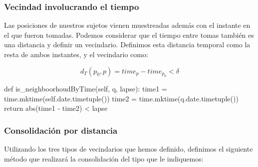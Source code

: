 \documentclass[10pt, spanish]{beamer}
\begin{document}
\begin{frame}[fragile]
\frametitle{Vecindad involucrando el tiempo}
Las posiciones de nuestros sujetos vienen muestreadas adem\'as con el instante en el que fueron tomadas. Podemos considerar que el tiempo entre tomas tambi\'en es una distancia y definir un vecindario. Definimos esta distancia temporal como la resta de ambos instantes, y el vecindario como: 

$$ d_T(p_0, p) = time_p - time_{p_0} < \delta $$

\bigskip

\begin{python}
    def is_neighboorhoudByTime(self, q, lapse):
	time1 = time.mktime(self.date.timetuple())
	time2 = time.mktime(q.date.timetuple())
	return abs(time1 - time2) < lapse
\end{python}

\end{frame}

\begin{frame}[fragile]
\frametitle{Consolidaci\'on por distancia}
Utilizando los tres tipos de vecindarios que hemos definido, definimos el
siguiente m\'etodo que realizará la consolidaci\'on del tipo que le indiquemos:\\

\bigskip

\begin{algorithmic}[1]
        \Else
        \EndIf
\EndFor
\EndFunction
\end{algorithmic}
\end{frame}
\end{document}

